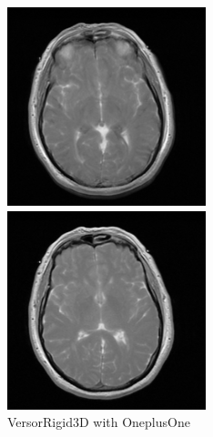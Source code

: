 \documentclass[11pt,english]{article}
\begin{document}
\begin{figure}[h!]
    \centering
    \begin{minipage}[b]{0.3\textwidth}
        \includegraphics[width = \textwidth]{images/versorOnePlusOne.PNG}
        \caption{VersorRigid3D with OneplusOne}
        \label{fig:versor1plus1}
      \end{minipage}
    \begin{minipage}[b]{0.3\textwidth}
      \includegraphics[width = \textwidth]{images/VersorLBFGS.PNG}

\end{minipage}
\end{figure}
\end{document}

